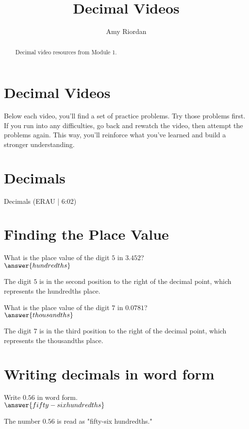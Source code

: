 \documentclass{ximera}
\title{Decimal Videos}
\author{Amy Riordan}
\begin{document}
\begin{abstract}
Decimal video resources from Module 1.
\end{abstract}
\maketitle

\section*{Decimal Videos}

Below each video, you’ll find a set of practice problems. Try those problems first. If you run into any difficulties, go back and rewatch the video, then attempt the problems again. This way, you’ll reinforce what you’ve learned and build a stronger understanding.

\section*{Decimals}

Decimals (ERAU | 6:02)



\section*{Finding the Place Value}
\begin{problem}
What is the place value of the digit $5$ in $3.452$?\\
$\answer{hundredths}$
\begin{feedback}
The digit $5$ is in the second position to the right of the decimal point, which represents the hundredths place.
\end{feedback}
\end{problem}

\begin{problem}
What is the place value of the digit $7$ in $0.0781$?\\
$\answer{thousandths}$
\begin{feedback}
The digit $7$ is in the third position to the right of the decimal point, which represents the thousandths place.
\end{feedback}
\end{problem}

\section*{Writing decimals in word form}
\begin{problem}
Write $0.56$ in word form.\\
$\answer{fifty-six hundredths}$
\begin{feedback}
The number $0.56$ is read as "fifty-six hundredths."
\end{feedback}
\end{problem}
\end{document}
